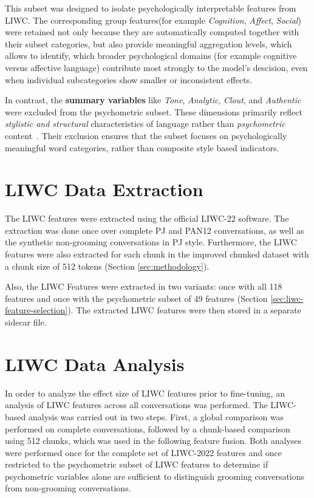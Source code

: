 This subset was designed to isolate psychologically interpretable features from LIWC. The corresponding group features(for example \textit{Cognition}, \textit{Affect}, \textit{Social}) were retained not only because they are automatically computed together with their subset categories, but also provide meaningful aggregation levels, which allows to identify, which broader psychological domains (for example cognitive versus affective language) contribute most strongly to the model's descision, even when individual subcategories show smaller or inconsistent effects. 

In contrast, the \textbf{summary variables} like \textit{Tone}, \textit{Analytic}, \textit{Clout}, and \textit{Authentic} were excluded from the psychometric subset. These dimensions primarily reflect \textit{stylistic and structural} characteristics of language rather than \textit{psychometric} content~\cite{pennebaker2022liwc,tausczik2010psychological}. 
Their exclusion ensures that the subset focuses on psychologically meaningful word categories, rather than composite style based indicators. 


\section{LIWC Data Extraction}
The LIWC features were extracted using the official LIWC-22 software. The extraction was done once over complete PJ and PAN12 conversations, as well as the synthetic non-grooming conversations in PJ style. Furthermore, the LIWC features were also extracted for each chunk in the improved chunked dataset with a chunk size of 512 tokens (Section \ref{sec:methodology}).

Also, the LIWC Features were extracted in two variants: once with all 118 features and once with the psychometric subset of 49 features (Section \ref{sec:liwc-feature-selection}). The extracted LIWC features were then stored in a separate sidecar file.

\section{LIWC Data Analysis}

In order to analyze the effect size of LIWC features prior to fine-tuning, an analysis of LIWC features across all conversations was performed.
The LIWC-based analysis was carried out in two steps. First, a global comparison was performed on complete conversations, followed by a chunk-based comparison using 512 chunks, which was used in the following feature fusion. Both analyses were performed once for the complete set of LIWC-2022 features and once restricted to the psychometric subset of LIWC features to determine if psychometric variables alone are sufficient to distinguish grooming conversations from non-grooming conversations.

